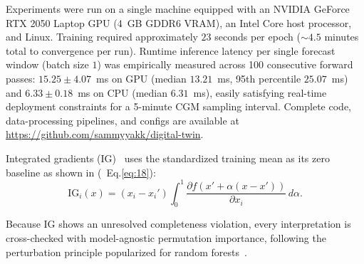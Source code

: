 \documentclass[journal]{IEEEtran}
\begin{document}
Experiments were run on a single machine equipped with an NVIDIA GeForce RTX 2050 Laptop GPU (4~GB GDDR6 VRAM), an Intel Core host processor, and Linux. Training required approximately $23$ seconds per epoch ($\sim 4.5$ minutes total to convergence per run). Runtime inference latency per single forecast window (batch size $1$) was empirically measured across 100 consecutive forward passes: $15.25 \pm 4.07$~ms on GPU (median $13.21$~ms, 95th percentile $25.07$~ms) and $6.33 \pm 0.18$~ms on CPU (median $6.31$~ms), easily satisfying real-time deployment constraints for a 5-minute CGM sampling interval. Complete code, data-processing pipelines, and configs are available at \url{https://github.com/sammyyakk/digital-twin}.

Integrated gradients (IG)~\cite{ref54} uses the standardized training mean as its zero baseline as shown in (\ Eq.\eqref{eq:18}):
\begin{equation}
\text{IG}_i(x) = (x_i - x_i') \int_0^1 \frac{\partial f(x' + \alpha(x - x'))}{\partial x_i}\, d\alpha.
\label{eq:18}
\end{equation}

Because IG shows an unresolved completeness violation, every interpretation is cross-checked with model-agnostic permutation importance, following the perturbation principle popularized for random forests~\cite{ref55}.
\end{document}
